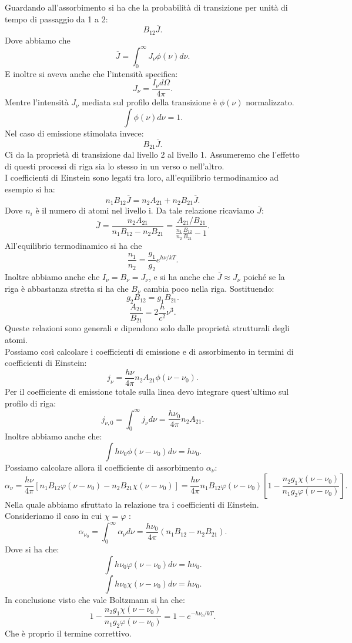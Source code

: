Guardando all'assorbimento si ha che la probabilità di transizione per unità di tempo di passaggio da 1 a 2:
\[
B_{12}\overline{J}
.\] 
Dove abbiamo che 
\[
    \overline{J} = \int_{0}^{\infty}  J_\nu \phi (\nu) d\nu
.\] 
E inoltre si aveva anche che l'intensità specifica:
\[
J_{\nu} = \frac{I_{\nu}d\Omega}{4\pi}
.\] 
Mentre l'intensità $J_{\nu}$ mediata sul profilo della transizione è $\phi (\nu) $ normalizzato.
\[
    \int \phi(\nu) d\nu  = 1
.\] 
Nel caso di emissione stimolata invece:
\[
B_{21}\overline{J}
.\] 
Ci da la proprietà di transizione dal livello 2 al livello 1. Assumeremo che l'effetto di questi processi di riga sia lo stesso in un verso o nell'altro.\\
I coefficienti di Einstein sono legati tra loro, all'equilibrio termodinamico ad esempio si ha:
\[
n_1 B_{12}\overline{J} = n_2 A_{21} + n_2 B_{21}\overline{J}
.\] 
Dove $n_i$ è il numero di atomi nel livello i. Da tale relazione ricaviamo $ \overline{J}$:
\[
\overline{J} = \frac{n_2A_{21}}{n_1 B_{12}-n_2 B_{21}}
=
\frac{A_{21} /B_{21}}{\frac{n_{1}}{n_2}\frac{B_{12}}{B_{21}} - 1}
.\] 
All'equilibrio termodinamico si ha che 
 \[
\frac{n_1}{n_2} = \frac{g_1}{g_2}e^{h\nu /kT}
.\] 
Inoltre abbiamo anche che $I_{\nu} = B_{\nu} = J_\nu$, e si ha anche che $ \overline{J}\approx J_\nu$ poiché se la riga è abbastanza stretta si ha che $B_{\nu}$ cambia poco nella riga.
Sostituendo:
\[
    g_2B_{12} = g_1B_{21}
.\] 
\[
\frac{A_{21}}{B_{21}} = 2 \frac{h}{c^2}\nu^3
.\] 
Queste relazioni sono generali e dipendono solo dalle proprietà strutturali degli atomi.\\
Possiamo così calcolare i coefficienti di emissione e di assorbimento in termini di coefficienti di Einstein:
\[
    j_\nu  = \frac{h\nu}{4\pi} n_2A_{21}\phi (\nu-\nu_0) 
.\] 
Per il coefficiente di emissione totale sulla linea devo integrare quest'ultimo sul profilo di riga:
\[
j_{\nu,0} = \int_{0}^{\infty} j_\nu  d\nu  = \frac{h \nu_0}{4\pi} n_2 A_{21} 
.\] 
Inoltre abbiamo anche che:
\[
    \int h\nu_0 \phi (\nu-\nu_0) d\nu  = h \nu_0
.\] 
Possiamo calcolare allora il coefficiente di assorbimento $\alpha_\nu$:
\[
    \alpha_\nu  = \frac{h\nu}{4\pi} \left[n_1B_{12}\varphi (\nu-\nu_0)
    - n_2 B_{21} \chi (\nu-\nu_0) \right]=
    \frac{h\nu}{4\pi}n_1B_{12}\varphi (\nu-\nu_0) 
    \left[1-\frac{n_2g_1\chi (\nu-\nu_0) }{n_1g_2\varphi (\nu-\nu_0) }\right]
.\] 
Nella quale abbiamo sfruttato la relazione tra i coefficienti di Einstein.\\
Consideriamo il caso in cui $\chi = \varphi$ :
\[
\alpha_{\nu_0} = \int_{0}^{\infty} \alpha_\nu  d\nu  
=
\frac{h\nu_0}{4\pi}\left(n_1B_{12}-n_2B_{21}\right)
.\] 
Dove si ha che:
\[
    \int h\nu_0 \varphi (\nu-\nu_0) d\nu  = h \nu_0
.\]
\[
    \int h\nu_0 \chi (\nu-\nu_0) d\nu  = h \nu_0
.\]
In conclusione visto che vale Boltzmann si ha che:
\[
    1-\frac{n_2g_1\chi (\nu-\nu_0) }{n_1g_2\varphi (\nu-\nu_0) } 
    = 1 - e^{-h\nu_0 /kT}
.\] 
Che è proprio il termine correttivo.\\
